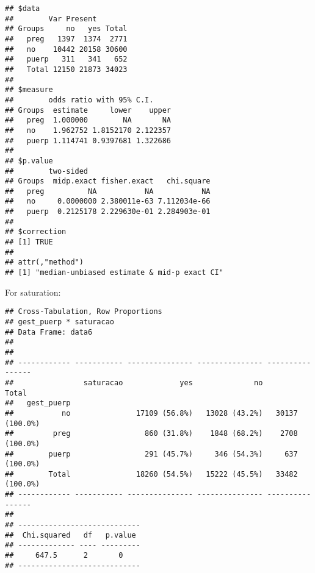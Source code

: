 \documentclass[
]{article}
\newenvironment{Shaded}{\begin{snugshade}}{\end{snugshade}}
\newcommand{\DataTypeTok}[1]{\textcolor[rgb]{0.13,0.29,0.53}{#1}}
\newcommand{\KeywordTok}[1]{\textcolor[rgb]{0.13,0.29,0.53}{\textbf{#1}}}
\newcommand{\NormalTok}[1]{#1}
\newcommand{\OperatorTok}[1]{\textcolor[rgb]{0.81,0.36,0.00}{\textbf{#1}}}
\newcommand{\OtherTok}[1]{\textcolor[rgb]{0.56,0.35,0.01}{#1}}
\newcommand{\StringTok}[1]{\textcolor[rgb]{0.31,0.60,0.02}{#1}}
\begin{document}
\begin{verbatim}
## $data
##        Var Present
## Groups     no   yes Total
##   preg   1397  1374  2771
##   no    10442 20158 30600
##   puerp   311   341   652
##   Total 12150 21873 34023
## 
## $measure
##        odds ratio with 95% C.I.
## Groups  estimate     lower    upper
##   preg  1.000000        NA       NA
##   no    1.962752 1.8152170 2.122357
##   puerp 1.114741 0.9397681 1.322686
## 
## $p.value
##        two-sided
## Groups  midp.exact fisher.exact   chi.square
##   preg          NA           NA           NA
##   no     0.0000000 2.380011e-63 7.112034e-66
##   puerp  0.2125178 2.229630e-01 2.284903e-01
## 
## $correction
## [1] TRUE
## 
## attr(,"method")
## [1] "median-unbiased estimate & mid-p exact CI"
\end{verbatim}

For saturation:

\begin{Shaded}
\end{Shaded}

\begin{verbatim}
## Cross-Tabulation, Row Proportions  
## gest_puerp * saturacao  
## Data Frame: data6  
## 
## 
## ------------ ----------- --------------- --------------- ----------------
##                saturacao             yes              no            Total
##   gest_puerp                                                             
##           no               17109 (56.8%)   13028 (43.2%)   30137 (100.0%)
##         preg                 860 (31.8%)    1848 (68.2%)    2708 (100.0%)
##        puerp                 291 (45.7%)     346 (54.3%)     637 (100.0%)
##        Total               18260 (54.5%)   15222 (45.5%)   33482 (100.0%)
## ------------ ----------- --------------- --------------- ----------------
## 
## ----------------------------
##  Chi.squared   df   p.value 
## ------------- ---- ---------
##     647.5      2       0    
## ----------------------------
\end{verbatim}

\begin{Shaded}
\end{Shaded}
\end{document}
